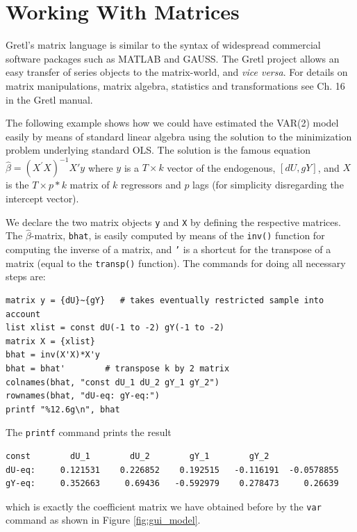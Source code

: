\documentclass[11pt]{article}
\begin{document}
\section{Working With Matrices}
Gretl's matrix language is similar to the syntax of widespread commercial software packages such as MATLAB and GAUSS. The Gretl project allows an easy transfer of series objects to the matrix-world, and \textit{vice versa}. For details on matrix manipulations, matrix algebra, statistics and transformations see Ch. 16 in the Gretl manual.

The following example shows how we could have estimated the VAR(2) model easily by means of standard linear algebra using the solution to the minimization problem underlying standard OLS. The solution is the famous equation $ \hat \beta = (X^\prime X)^{-1} X'y $ where $ y $  is a $ T \times k $ vector of the endogenous, $ [dU, gY] $, and $ X $ is the $ T \times p*k $ matrix of $ k $ regressors and $ p $ lags (for simplicity disregarding the intercept vector).

We declare the two matrix objects \texttt{y} and \texttt{X} by defining the respective matrices. The $ \hat \beta $-matrix, \texttt{bhat}, is easily computed by means of the \texttt{inv()} function for computing the inverse of a matrix, and \texttt{'} is a shortcut for the transpose of a matrix (equal to the \texttt{transp()} function). The commands for doing all necessary steps are:
\begin{Verbatim}[baselinestretch=0.75, fontsize=\small]
matrix y = {dU}~{gY}   # takes eventually restricted sample into account
list xlist = const dU(-1 to -2) gY(-1 to -2)
matrix X = {xlist}
bhat = inv(X'X)*X'y
bhat = bhat'		# transpose k by 2 matrix
colnames(bhat, "const dU_1 dU_2 gY_1 gY_2")
rownames(bhat, "dU-eq: gY-eq:")
printf "%12.6g\n", bhat
\end{Verbatim}
The \texttt{printf} command prints the result
\begin{Verbatim}[baselinestretch=0.75, fontsize=\small]
              const        dU_1        dU_2        gY_1        gY_2
dU-eq:     0.121531    0.226852    0.192515   -0.116191  -0.0578855
gY-eq:     0.352663     0.69436   -0.592979    0.278473     0.26639
\end{Verbatim}
which is exactly the coefficient matrix we have obtained before by the \texttt{var} command as shown in Figure \ref{fig:gui_model}.
\end{document}
